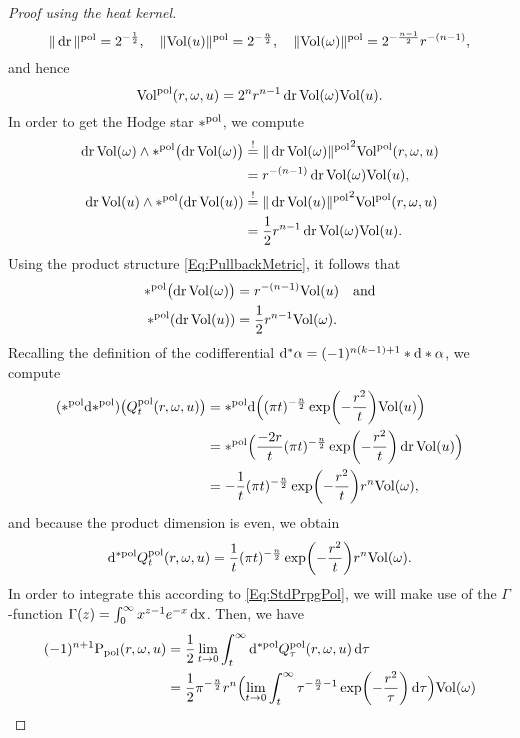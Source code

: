 \documentclass[\MainFolder/Text.tex]{subfiles}
\begin{document}
\begin{proof}[Proof using the heat kernel]
$$ \| \operatorname{dr} \|^{\mathrm{pol}} = 2^{-\frac{1}{2}},\quad\| \mathrm{Vol}(u) \|^{\mathrm{pol}} = 2^{-\frac{n}{2}},\quad\| \mathrm{Vol}(\omega) \|^{\mathrm{pol}} = 2^{-\frac{n-1}{2}} r^{-(n-1)}, $$
and hence
$$ \mathrm{Vol}^{\mathrm{pol}}(r,\omega,u) = 2^{n}r^{n-1}\operatorname{dr}\mathrm{Vol}(\omega)\mathrm{Vol}(u). $$
In order to get the Hodge star $*^{\mathrm{pol}}$, we compute
\begin{align*}
\operatorname{dr}\mathrm{Vol}(\omega)\wedge *^{\mathrm{pol}} \bigl(\operatorname{dr}\mathrm{Vol}(\omega)\bigr) & \overset{!}{=} {\| \operatorname{dr}\mathrm{Vol}(\omega) \|^{\mathrm{pol}}}^2 \mathrm{Vol}^{\mathrm{pol}}(r,\omega,u) \\
&=r^{-(n-1)} \operatorname{dr}\mathrm{Vol}(\omega)\mathrm{Vol}(u), \\
\operatorname{dr}\mathrm{Vol}(u) \wedge *^{\mathrm{pol}}(\operatorname{dr}\mathrm{Vol}(u)) &\overset{!}{=} {\| \operatorname{dr} \mathrm{Vol}(u) \|^{\mathrm{pol}}}^2\mathrm{Vol}^{\mathrm{pol}}(r,\omega,u) \\ 
&=\frac{1}{2} r^{n-1} \operatorname{dr} \mathrm{Vol}(\omega) \mathrm{Vol}(u).
\end{align*}
Using the product structure \eqref{Eq:PullbackMetric}, it follows that
\begin{align*}
*^{\mathrm{pol}}\bigl(\operatorname{dr}\mathrm{Vol}(\omega)\bigr)&=r^{-(n-1)} \mathrm{Vol}(u)\quad\text{and}\\
*^{\mathrm{pol}}(\operatorname{dr}\mathrm{Vol}(u))&= \frac{1}{2} r^{n-1} \mathrm{Vol}(\omega).
\end{align*}
Recalling the definition of the codifferential $\mathrm{d}^* \alpha = (-1)^{n(k-1)+1} *\mathrm{d}* \alpha$, we compute
\begin{align*}
(*^{\mathrm{pol}} \mathrm{d} *^{\mathrm{pol}})\bigl(Q^{\mathrm{pol}}_t(r,\omega,u)\bigr) &=  *^{\mathrm{pol}} \mathrm{d} \Bigl( (\pi t)^{-\frac{n}{2}} \exp(-\frac{r^2}{t}) \mathrm{Vol}(u) \Bigr)  \\ 
& = *^{\mathrm{pol}}\Bigl(\frac{-2r}{t}(\pi t)^{-\frac{n}{2}}\exp(-\frac{r^2}{t}) \operatorname{dr} \mathrm{Vol}(u)\Bigr)\\
&= -\frac{1}{t}(\pi t)^{-\frac{n}{2}} \exp(-\frac{r^2}{t}) r^n \mathrm{Vol}(\omega),
\end{align*}
and because the product dimension is even, we obtain
$$ \mathrm{d}^{*\mathrm{pol}} Q^{\mathrm{pol}}_t(r,\omega,u) = \frac{1}{t}(\pi t)^{-\frac{n}{2}} \exp(-\frac{r^2}{t}) r^n \mathrm{Vol}(\omega). $$
In order to integrate this according to \eqref{Eq:StdPrpgPol}, we will make use of the $\Gamma$-function $\Gamma(z) = \int_0^\infty x^{z-1} e^{-x} \operatorname{dx}$. Then, we have
\begin{align*}
(-1)^{n+1}\StdPrpgPol(r,\omega,u)&=\frac{1}{2}\lim_{t\to 0} \int_t^\infty \CoDdPol \QKerPol_\tau(r,\omega,u)\Diff{\tau}\\
&=\frac{1}{2}\pi^{-\frac{n}{2}}r^n \Bigl(\lim_{t\to 0}\int_{t}^\infty \tau^{-\frac{n}{2} - 1} \exp(-\frac{r^2}{\tau})\Diff{\tau}\Bigr)\Vol(\omega)\\

\end{align*}
\end{proof}
\end{document}

